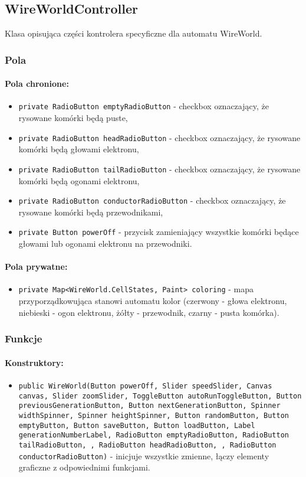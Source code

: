\documentclass{report}
\begin{document}
\subsection{WireWorldController}
Klasa opisująca części kontrolera specyficzne dla automatu WireWorld.
\subsubsection{Pola}
\paragraph{Pola chronione:}
\begin{itemize}	\label{sec:checkbox}
	\item \texttt{private RadioButton emptyRadioButton} - checkbox oznaczający, że rysowane komórki będą puste,
	\item \texttt{private RadioButton headRadioButton} - checkbox oznaczający, że rysowane komórki będą głowami elektronu,
	\item \texttt{private RadioButton tailRadioButton} - checkbox oznaczający, że rysowane komórki będą ogonami elektronu,
	\item \texttt{private RadioButton conductorRadioButton} - checkbox oznaczający, że rysowane komórki będą przewodnikami,
	\item \texttt{private Button powerOff} - przycisk zamieniający wszystkie komórki będące głowami lub ogonami elektronu na przewodniki.
\end{itemize}

\paragraph{Pola prywatne:}
\begin{itemize}
	\item \texttt{private Map<WireWorld.CellStates, Paint> coloring} - mapa przyporządkowująca stanowi automatu kolor (czerwony - głowa elektronu, niebieski - ogon elektronu, żółty - przewodnik, czarny - pusta komórka).
\end{itemize}
\subsubsection{Funkcje}
\paragraph{Konstruktory:}
\begin{itemize}
\item \texttt{public WireWorld(Button powerOff, Slider speedSlider, Canvas canvas, Slider zoomSlider, ToggleButton autoRunToggleButton, Button previousGenerationButton, Button nextGenerationButton, Spinner widthSpinner, Spinner heightSpinner, Button randomButton, Button emptyButton, Button saveButton, Button loadButton, Label generationNumberLabel, RadioButton emptyRadioButton, RadioButton tailRadioButton, , RadioButton headRadioButton, , RadioButton conductorRadioButton)} - inicjuje wszystkie zmienne, łączy elementy graficzne z odpowiednimi funkcjami.
\end{itemize}
\end{document}
